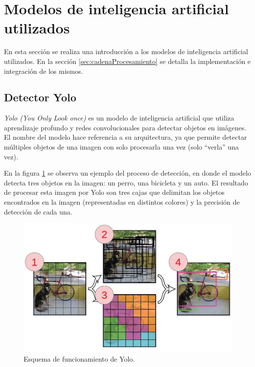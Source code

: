 \section{Modelos de inteligencia artificial utilizados}
\label{sec:modelosIA}

En esta sección se realiza una introducción a los modelos de inteligencia artificial utilizados. En la sección \ref{sec:cadenaProcesamiento} se detalla la implementación e integración de los mismos.

\subsection{Detector Yolo}

\textit{Yolo (You Only Look once)} \citep{YOLO_MODELO} es un modelo de inteligencia artificial que utiliza aprendizaje profundo y redes convolucionales para detectar objetos en imágenes. El nombre del modelo hace referencia a su arquitectura, ya que permite detectar múltiples objetos de una imagen con solo procesarla una vez (solo ``verla'' una vez). 

En la figura \ref{fig:diagramaYolo} se observa un ejemplo del proceso de detección, en donde el modelo detecta tres objetos en la imagen: un perro, una bicicleta y un auto. El resultado de procesar esta imagen por Yolo son tres cajas que delimitan los objetos encontrados en la imagen (representadas en distintos colores) y la precisión de detección de cada una.

\begin{figure}[ht]
	\centering
	\includegraphics[scale=.55]{./Figures/yolo.jpg}
	\caption{Esquema de funcionamiento de Yolo\protect\footnotemark.}
	\label{fig:diagramaYolo}
\end{figure}

